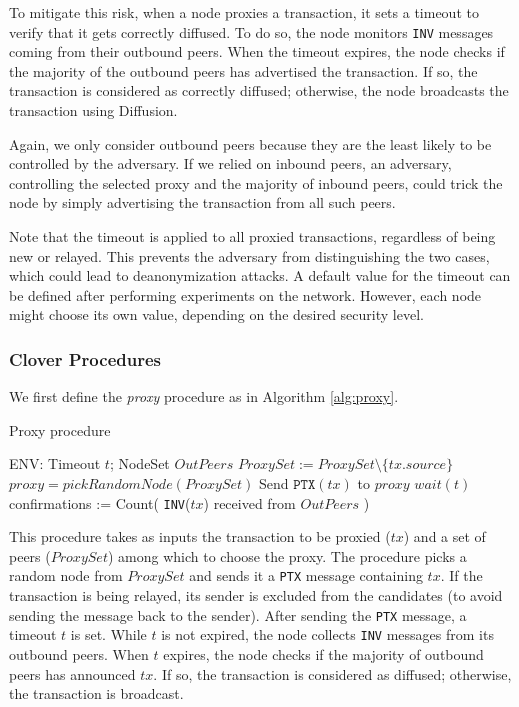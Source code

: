 \documentclass{article}
\begin{document}
	To mitigate this risk, when a node proxies a transaction, it sets a timeout to verify that it gets correctly diffused.
	To do so, the node monitors \texttt{INV} messages coming from their outbound peers.
	When the timeout expires, the node checks if the majority of the outbound peers has advertised the transaction.
	If so, the transaction is considered as correctly diffused; otherwise, the node broadcasts the transaction using Diffusion.
	
	Again, we only consider outbound peers because they are the least likely to be controlled by the adversary.
	If we relied on inbound peers, an adversary, controlling the selected proxy and the majority of inbound peers, could trick the node by simply advertising the transaction from all such peers.
	
	Note that the timeout is applied to all proxied transactions, regardless of being new or relayed.
	This prevents the adversary from distinguishing the two cases, which could lead to deanonymization attacks.	
	A default value for the timeout can be defined after performing experiments on the network.
	However, each node might choose its own value, depending on the desired security level.
	
	\subsubsection{Clover Procedures}
	We first define the \textit{proxy} procedure as in Algorithm \ref{alg:proxy}.
	\vspace{-5pt}
	\begin{algorithm}[h]
		\caption{Proxy procedure}
		\label{alg:proxy}
		\begin{algorithmic}[1]
			\Statex ENV: Timeout $t$; NodeSet $OutPeers$
			\State $ProxySet := ProxySet \setminus \{tx.source\}$
			\State $proxy = pickRandomNode(ProxySet)$
			\State Send $\texttt{PTX}(tx)$ to $proxy$
			\State $wait(t)$
			\State confirmations := Count( \texttt{INV}($tx$) received from $OutPeers$ )
			\State {}
			\EndIf
			\EndProcedure
		\end{algorithmic}
	\end{algorithm}
	
	This procedure takes as inputs the transaction to be proxied ($tx$) and a set of peers ($ProxySet$) among which to choose the proxy.
	The procedure picks a random node from $ProxySet$ and sends it a \texttt{PTX} message containing $tx$.
	If the transaction is being relayed, its sender is excluded from the candidates (to avoid sending the message back to the sender).
	After sending the \texttt{PTX} message, a timeout $t$ is set.
	While $t$ is not expired, the node collects \texttt{INV} messages from its outbound peers.
	When $t$ expires, the node checks if the majority of outbound peers has announced $tx$.
	If so, the transaction is considered as diffused; otherwise, the transaction is broadcast.
	
\end{document}
